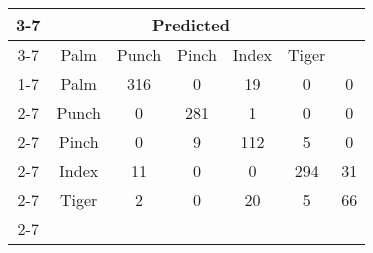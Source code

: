 \documentclass{standalone}
\begin{document}
 
 \begin{tabular}{|c |c |c |c |c |c |c |}
\cline{3-7}\multicolumn{2}{c|}{} & \multicolumn{5}{c|}{Predicted} \\ 
\cline{3-7} \multicolumn{2}{c |}{ } & Palm & Punch & Pinch & Index & Tiger\\ 
\cline{1-7}\multirow{5}{*}{\rotatebox[origin=c]{90}{Actual}} & Palm & 316 & 0 & 19 & 0 & 0\\ 
 \cline{2-7} & Punch & 0 & 281 & 1 & 0 & 0\\ 
 \cline{2-7} & Pinch & 0 & 9 & 112 & 5 & 0\\ 
 \cline{2-7} & Index & 11 & 0 & 0 & 294 & 31\\ 
 \cline{2-7} & Tiger & 2 & 0 & 20 & 5 & 66\\ 
 \cline{2-7}\hline \end{tabular}
 
\end{document}
